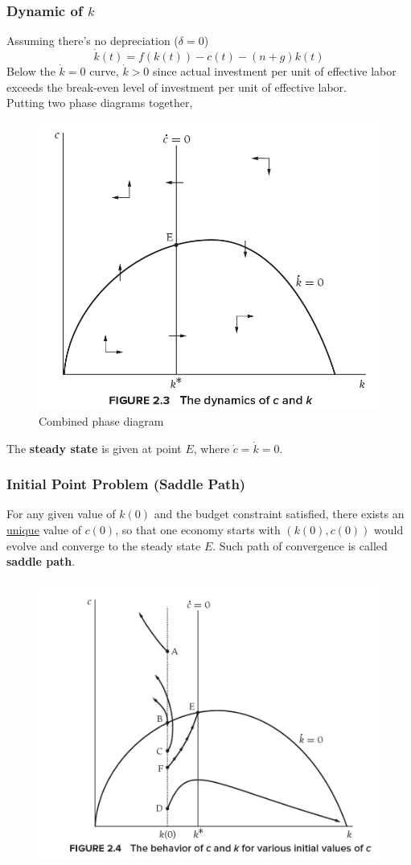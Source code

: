 \documentclass[11pt]{article}
\begin{document}
		\subsubsection{Dynamic of $k$}
		\par Assuming there's no depreciation ($\delta=0$)
		\begin{equation}
			\dot{k}(t) = f(k(t)) - c(t) - (n+g)k(t)
		\end{equation}
		Below the $\dot{k} = 0$ curve, $\dot{k} > 0$ since actual investment per unit of effective labor exceeds the break-even level of investment per unit of effective labor.
		\\
		Putting two phase diagrams together,
		\begin{figure}[h]
			\centering
			\caption{Combined phase diagram}
			\includegraphics[width=0.5\linewidth]{figures/6_3}
		\end{figure}
		The \textbf{steady state} is given at point $E$, where $\dot{c} = \dot{k} = 0$.
		
		\newpage
		\subsubsection{Initial Point Problem (Saddle Path)}
		\par For any given value of $k(0)$ and the budget constraint satisfied, there exists an \ul{unique} value of $c(0)$, so that one economy starts with $(k(0), c(0))$ would evolve and converge to the steady state $E$. Such path of convergence is called \textbf{saddle path}.
		\begin{figure}[h]
			\centering
			\includegraphics[width=0.5\linewidth]{figures/6_4}
		\end{figure}
\end{document}

